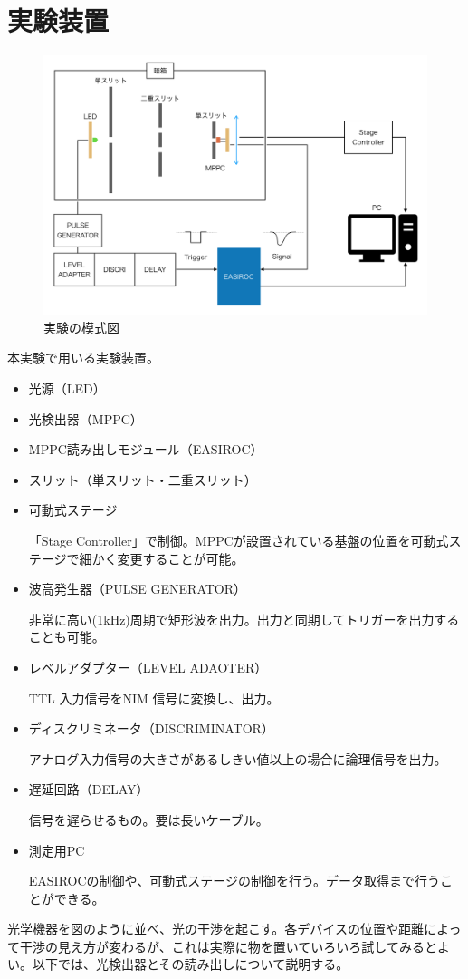 
\section{実験装置}
\begin{figure}[h]
  \begin{center}
    \includegraphics[width=12cm]{setup2019.png}
  \end{center}
  \caption{実験の模式図}
\end{figure}

本実験で用いる実験装置。
\begin{itemize}
  \item 光源（LED）
  \item 光検出器（MPPC）
  \item MPPC読み出しモジュール（EASIROC）
  \item スリット（単スリット・二重スリット）
  \item 可動式ステージ\par
        「Stage Controller」で制御。MPPCが設置されている基盤の位置を可動式ステージで細かく変更することが可能。
  \item 波高発生器（PULSE GENERATOR）\par
        非常に高い(1kHz)周期で矩形波を出力。出力と同期してトリガーを出力することも可能。
  \item レベルアダプター（LEVEL ADAOTER）\par
        TTL 入力信号をNIM 信号に変換し、出力。
  \item ディスクリミネータ（DISCRIMINATOR）\par
        アナログ入力信号の大きさがあるしきい値以上の場合に論理信号を出力。
  \item 遅延回路（DELAY）\par
        信号を遅らせるもの。要は長いケーブル。
  \item 測定用PC \par
        EASIROCの制御や、可動式ステージの制御を行う。データ取得まで行うことができる。
\end{itemize}
光学機器を図のように並べ、光の干渉を起こす。各デバイスの位置や距離によって干渉の見え方が変わるが、これは実際に物を置いていろいろ試してみるとよい。以下では、光検出器とその読み出しについて説明する。

